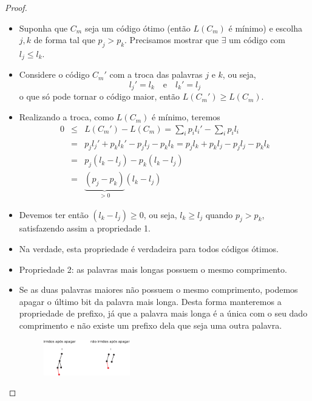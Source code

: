\begin{frame}[allowframebreaks]
  \framebreak
  \begin{proof}
  \begin{itemize}
  \item Suponha que $C_m$ seja um código ótimo (então $L(C_m)$ é mínimo) e escolha $j,k$ de forma tal que $p_j > p_k$.
	Precisamos mostrar que $\exists$ um código com $l_j \leq l_k$.
  \item Considere o código $C_m'$ com a troca das palavras $j$ e $k$, ou seja,
	\begin{equation}
	l_j' = l_k \quad \text{e} \quad l_k' = l_j
	\end{equation}
	o que só pode tornar o código maior, então $L(C_m') \geq L(C_m)$.
  \end{itemize}
  \proofbreak
  \begin{itemize}
  \item Realizando a troca, como $L(C_m)$ é mínimo, teremos
	\begin{eqnarray}
	0 &\leq& L(C_m') - L(C_m) = \sum_i p_i l_i' - \sum_i p_i l_i \nonumber \\
		&=& p_j l_j' + p_k l_k' - p_j l_j - p_k l_k = p_j l_k + p_k l_j - p_j l_j - p_k l_k \nonumber \\
		&=& p_j (l_k - l_j) - p_k (l_k - l_j) \nonumber \\
		&=& \underbrace{(p_j - p_k)}_{>0}  (l_k - l_j)
	\end{eqnarray}
  \item Devemos ter então $(l_k - l_j) \geq 0$, ou seja, $l_k \geq l_j$ quando $p_j > p_k$, satisfazendo assim a propriedade 1.
  \end{itemize}
  \proofbreak
  \begin{itemize}
  \item Na verdade, esta propriedade é verdadeira para todos códigos ótimos.
  \item Propriedade 2: as palavras mais longas possuem o mesmo comprimento.
  \item Se as duas palavras maiores não possuem o mesmo comprimento, podemos apagar o último bit da palavra mais longa.
	Desta forma manteremos a propriedade de prefixo, já que a palavra mais longa é a única com o seu dado comprimento e não
	existe um prefixo dela que seja uma outra palavra.
         \begin{figure}[h!]
         \centering
         \includegraphics[width=0.355555\textwidth]{images/lemmahuffman.pdf}

\end{figure}
\end{itemize}
\end{proof}
\end{frame}
